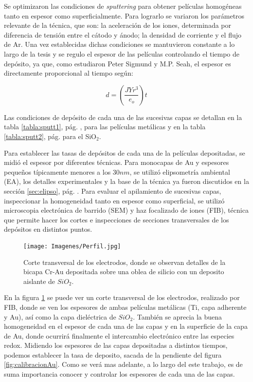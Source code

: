		 Se optimizaron las condiciones de \textit{sputtering} para obtener películas homogéneas tanto en espesor como superficialmente. Para lograrlo se variaron los parámetros relevante de la técnica, que son: la aceleración de los iones, determinada por diferencia de tensión entre el cátodo y ánodo; la densidad de corriente y el flujo de Ar. Una vez establecidas dichas condiciones se mantuvieron constante a lo largo de la tesis y se regulo el espesor de las películas controlando el tiempo de depósito, ya que, como estudiaron Peter Sigmund\cite{sigmund1968} y M.P. Seah\cite{Seah2005}, el espesor es directamente proporcional al tiempo según:

	 			\begin{equation}
	 				d=\left(\frac{JYr^3}{e_o}\right)t
	 			\end{equation}


		 Las condiciones de depósito de cada una de las sucesivas capas se detallan en la tabla \ref{tabla:sputt1}, pág. \pageref{tabla:sputt1}, para las películas metálicas y en la tabla  \ref{tabla:sputt2}, pág. \pageref{tabla:sputt2} para el SiO$_2$. 

		 Para establecer las tasas de depósitos de cada una de la películas depositadas, se midió el espesor por diferentes técnicas. Para monocapas de Au y espesores pequeños típicamente menores a los $30nm$, se utilizó elipsometría ambiental (EA), los detalles experimentales y la base de la técnica ya fueron discutidos en la sección \ref{sec:elipso}, pág. \pageref{sec:elipso}. Para evaluar el apilamiento de sucesivas capas, inspeccionar la homogeneidad tanto en espesor como superficial, se utilizó microscopia electrónica de barrido (SEM) y haz focalizado de iones (FIB), técnica que permite hacer los cortes e inspecciones de secciones transversales de los depósitos en distintos puntos. 

						  \begin{figure}[ht!]
						  \begin{center}
						  \texttt{[image: Imagenes/Perfil.jpg]}
						  \caption[Sección trasversal de los eletrodos]{Corte transversal de los electrodos, donde se observan detalles de la bicapa Cr-Au depositada sobre una oblea de silicio con un deposito aislante de $SiO_2$.}
						  \label{fig:FIB_electrodos}
						  \end{center}
						  \end{figure} 		
					
	 
		 En la figura \ref{fig:FIB_electrodos} se puede ver un corte transversal de los electrodos, realizado por FIB, donde se ven los espesores de ambas películas metálicas (Ti, capa adherente y Au), así como la capa dieléctrica de $SiO_2$. También se aprecia la buena homogeneidad en el espesor de cada una de las capas y en la superficie de la capa de Au, donde ocurrirá finalmente el intercambio electrónico entre las especies redox. Midiendo los espesores de las capas depositadas a distintos tiempos, podemos establecer la tasa de deposito, sacada de la pendiente del figura \ref{fig:calibracionAu}. Como se verá mas adelante, a lo largo del este trabajo, es de suma importancia conocer y controlar los espesores de cada una de las capas.
						
